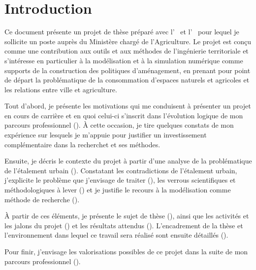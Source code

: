 \section
{Introduction}

Ce document présente un projet de thèse préparé avec l’{\UMR\ \EVS} et l’{\UMR\ \TETIS}
pour lequel je sollicite un poste {\FCPR} auprès du Ministère chargé de
l’Agriculture.
Le projet est conçu comme une contribution aux outils et aux méthodes
de l’ingénierie territoriale et s’intéresse en particulier à la modélisation
et à la simulation numérique comme supports de la construction
des politiques d'aménagement, en prenant pour point de départ
la problématique de la consommation d’espaces
naturels et agricoles et les relations entre ville et agriculture.

Tout d’abord, je présente les motivations qui me conduisent à présenter un
projet {\FCPR}  en cours de carrière et en quoi celui-ci s’inscrit dans l'évolution logique
de mon parcours professionnel (\in[origin]). À cette
occasion, je tire quelques constats de mon expérience sur lesquels
je m'appuie pour justifier un investissement complémentaire dans la recherchet
et ses méthodes.

Ensuite, je décris le contexte du projet à partir d’une analyse de la
problématique de l’étalement urbain (\in[contexte]). Constatant les contradictions
de l'étalement urbain, j'explicite le problème que j'envisage de traiter (\in[probleme]),
les verrous scientifiques et méthodologiques à lever (\in[verrous]) et je justifie
le recours à la modélisation comme méthode de recherche (\in[methodo]).

À partir de ces éléments, je présente le sujet de thèse (\in[sujet]),
ainsi que les activités et les jalons du projet (\in[planning])
et les résultats attendus (\in[resultats]).
L'encadrement de la thèse et l'environnement dans lequel ce travail
sera réalisé sont ensuite détaillés (\in[environnement]).

Pour finir, j’envisage les valorisations possibles de ce projet dans la suite de mon
parcours professionnel (\in[suites]).